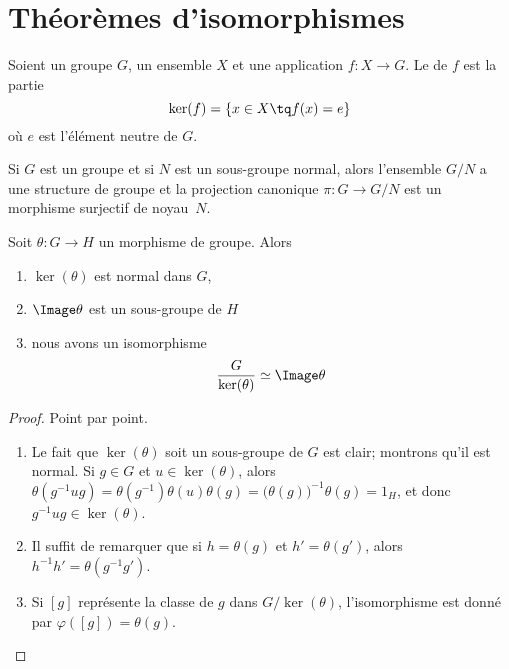 \section{Théorèmes d'isomorphismes}

\begin{definition}      \label{DEFooWBIYooGNRYOp}
	Soient un groupe \( G\), un ensemble \( X\) et une application \( f\colon X\to G\). Le  de \( f\) est la partie
	\begin{equation}
		\ker(f)=\{ x\in X\tq f(x)=e \}
	\end{equation}
	où \( e\) est l'élément neutre de \( G\).
\end{definition}

Si \( G\) est un groupe et si \( N\) est un sous-groupe normal, alors l'ensemble \( G/N\) a une structure de groupe et la projection canonique \( \pi\colon G\to G/N\) est un morphisme surjectif de noyau~\( N\).

\begin{theorem}        \label{ThoPremierthoisomo}
	Soit \( \theta\colon G\to H\) un morphisme de groupe. Alors
	\begin{enumerate}
		\item
		      \( \ker(\theta)\) est normal dans \( G\),
		\item
		      \( \Image \theta\) est un sous-groupe de \( H\)
		\item   \label{ItemWLCLdk}
		      nous avons un isomorphisme
		      \begin{equation}
			      \frac{ G }{ \ker(\theta) }   \simeq \Image\theta
		      \end{equation}
	\end{enumerate}
\end{theorem}

\begin{proof}
	Point par point.
	\begin{enumerate}
		\item
		      Le fait que  \( \ker(\theta)\) soit un sous-groupe de \( G\) est clair; montrons qu'il est normal. Si \( g \in G \) et \( u \in \ker(\theta)\), alors \(\theta (g^{-1} u g) = \theta(g^{-1})\theta(u)\theta(g) = \bigl(\theta(g)\bigr)^{-1}\theta(g) = 1_H \), et donc \( g^{-1} u g \in \ker(\theta)\).
		\item
		      Il suffit de remarquer que si \( h = \theta(g) \) et \( h' = \theta(g') \), alors \( h^{-1} h' = \theta(g^{-1} g') \).
		\item
		      Si \( [g]\) représente la classe de \( g\) dans \( G/\ker(\theta)\), l'isomorphisme est donné par \( \varphi([g])=\theta(g)\).
	\end{enumerate}
\end{proof}

